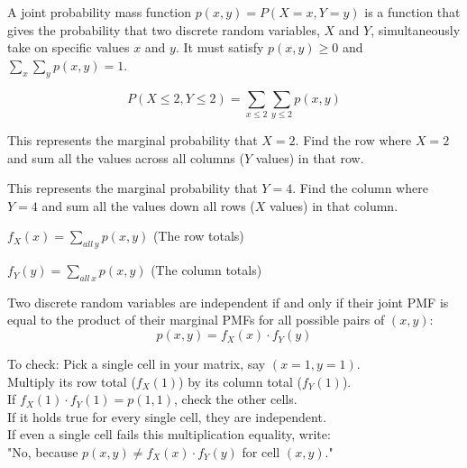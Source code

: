 \documentclass[12pt]{article}
\begin{document}
\begin{enumerate}


A joint probability mass function $p(x, y) = P(X = x, Y = y)$ is a function that gives the probability that two discrete random variables, $X$ and $Y$, simultaneously take on specific values $x$ and $y$. It must satisfy $p(x,y) \ge 0$ and $\sum_x \sum_y p(x,y) = 1$.


$$P(X \le 2, Y \le 2) = \sum_{x \le 2} \sum_{y \le 2} p(x, y)$$


This represents the marginal probability that $X = 2$. Find the row where $X=2$ and sum all the values across all columns ($Y$ values) in that row.


This represents the marginal probability that $Y = 4$. Find the column where $Y=4$ and sum all the values down all rows ($X$ values) in that column.


$f_X(x) = \sum_{all \, y} p(x, y)$ (The row totals)


$f_Y(y) = \sum_{all \, x} p(x, y)$ (The column totals)


Two discrete random variables are independent if and only if their joint PMF is equal to the product of their marginal PMFs for all possible pairs of $(x, y)$:$$p(x, y) = f_X(x) \cdot f_Y(y)$$


To check: Pick a single cell in your matrix, say $(x=1, y=1)$. \\Multiply its row total ($f_X(1)$) by its column total ($f_Y(1)$).\\If $f_X(1) \cdot f_Y(1) = p(1,1)$, check the other cells. \\If it holds true for every single cell, they are independent.\\If even a single cell fails this multiplication equality, write: \\"No, because $p(x,y) \neq f_X(x) \cdot f_Y(y)$ for cell $(x,y)$."

\end{enumerate}
\end{document}
